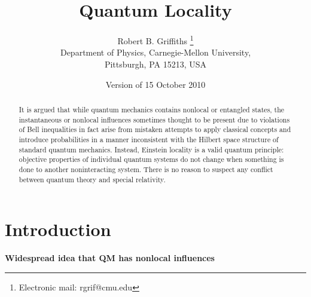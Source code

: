 \documentclass[12pt]{article} %
\def\outl#1{\par{\medskip\noindent\hspace*{.5cm}\bf
      \mathversion{bold}#1\mathversion{normal}\smallskip} }
\def\np{} \def\xa{} \def\xb{} \def\xn{} \def\xp{}
\def\outl#1{} \def\np{} \def\xa{} \def\xb{} \def\xn{} \def\xp{}
\def\outl#1{\par{\medskip\noindent\hspace*{.5cm}\bf
      \mathversion{bold}#1\mathversion{normal}\smallskip} }
\def\np{\newpage }\def\xn{\nopagebreak }\def\xp{\pagebreak }
\begin{document}
\title{Quantum Locality}

\author{Robert B. Griffiths
\thanks{Electronic mail: rgrif@cmu.edu}\\ 
Department of Physics,
Carnegie-Mellon University,\\
Pittsburgh, PA 15213, USA}

\date{Version of 15 October 2010}

\maketitle

\xa
\begin{abstract}
 
  It is argued that while quantum mechanics contains nonlocal or entangled
  states, the instantaneous or nonlocal influences sometimes thought to be
  present due to violations of Bell inequalities in fact arise from mistaken
  attempts to apply classical concepts and introduce probabilities in a manner
  inconsistent with the Hilbert space structure of standard quantum mechanics.
  Instead, Einstein locality is a valid quantum principle:
  objective properties of individual quantum systems do not change when
  something is done to another noninteracting system.  There is no reason to
  suspect any conflict between quantum theory and special relativity.

\end{abstract}

\xb

	\section{Introduction}
\label{sct1}
\xa

\xb
\outl{Widespread idea that QM has nonlocal influences}
\xa
\end{document}
